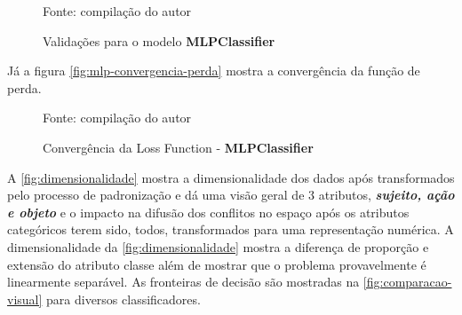 \begin{figure}[h]
	\centering
	\caption{Validações para o modelo \textbf{MLPClassifier}}
	
	\label{fig:validacao_notebook}
	{\scriptsize Fonte: compilação do autor}
\end{figure}


Já a figura \autoref{fig:mlp-convergencia-perda} mostra a convergência da função de perda.
\begin{figure}[H]
	\centering
	\caption{Convergência da Loss Function - \textbf{MLPClassifier}}
	
	\label{fig:mlp-convergencia-perda}
	{\scriptsize Fonte: compilação do autor}
\end{figure}

A \autoref{fig:dimensionalidade} mostra a dimensionalidade dos dados após transformados pelo processo de padronização e dá uma visão geral de 3 atributos, \textit{\textbf{sujeito, ação e objeto}} e o impacto na difusão dos conflitos no espaço após os atributos categóricos terem sido, todos, transformados para uma representação numérica. A dimensionalidade da \autoref{fig:dimensionalidade} mostra a diferença de proporção e extensão do atributo classe além de mostrar que o problema provavelmente é linearmente separável. As fronteiras de decisão são mostradas na \autoref{fig:comparacao-visual} para diversos classificadores.

